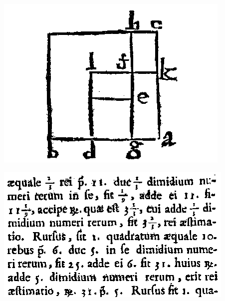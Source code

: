\begin{minipage}[t]{0.32\linewidth}\vspace{-5pt}
	\flushright\includegraphics[width=\linewidth]{cardano3}\par
	\includegraphics[width=\linewidth]{cardano2}
\end{minipage}\par


